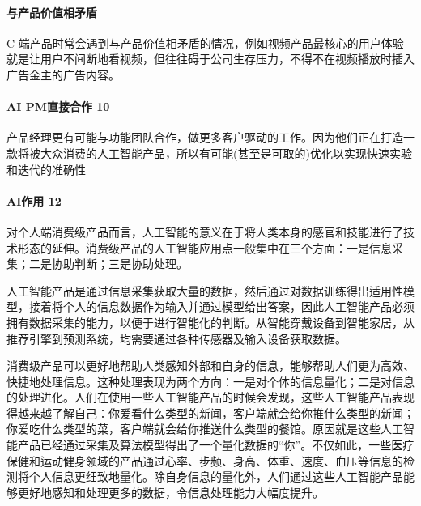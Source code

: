 \documentclass[letterpaper,11pt,english]{sphinxmanual}
\begin{document}
\paragraph{与产品价值相矛盾}
\label{\detokenize{chapter_introduction/2C:id11}}
C
端产品时常会遇到与产品价值相矛盾的情况，例如视频产品最核心的用户体验就是让用户不间断地看视频，但往往碍于公司生存压力，不得不在视频播放时插入广告金主的广告内容。


\paragraph{AI PM直接合作 10\sphinxfootnotemark[39]}
\label{\detokenize{chapter_introduction/2C:ai-pm-10}}%
\begin{footnotetext}[39]\sphinxAtStartFootnote
{}
%
\end{footnotetext}\ignorespaces 
产品经理更有可能与功能团队合作，做更多客户驱动的工作。因为他们正在打造一款将被大众消费的人工智能产品，所以有可能(甚至是可取的)优化以实现快速实验和迭代的准确性


\paragraph{AI作用 12\sphinxfootnotemark[40]}
\label{\detokenize{chapter_introduction/2C:ai-12}}%
\begin{footnotetext}[40]\sphinxAtStartFootnote
{}
%
\end{footnotetext}\ignorespaces 
对个人端消费级产品而言，人工智能的意义在于将人类本身的感官和技能进行了技术形态的延伸。消费级产品的人工智能应用点一般集中在三个方面：一是信息采集；二是协助判断；三是协助处理。

人工智能产品是通过信息采集获取大量的数据，然后通过对数据训练得出适用性模型，接着将个人的信息数据作为输入并通过模型给出答案，因此人工智能产品必须拥有数据采集的能力，以便于进行智能化的判断。从智能穿戴设备到智能家居，从推荐引擎到预测系统，均需要通过各种传感器及输入设备获取数据。

消费级产品可以更好地帮助人类感知外部和自身的信息，能够帮助人们更为高效、快捷地处理信息。这种处理表现为两个方向：一是对个体的信息量化；二是对信息的处理进化。人们在使用一些人工智能产品的时候会发现，这些人工智能产品表现得越来越了解自己：你爱看什么类型的新闻，客户端就会给你推什么类型的新闻；你爱吃什么类型的菜，客户端就会给你推送什么类型的餐馆。原因就是这些人工智能产品已经通过采集及算法模型得出了一个量化数据的“你”。不仅如此，一些医疗保健和运动健身领域的产品通过心率、步频、身高、体重、速度、血压等信息的检测将个人信息更细致地量化。除自身信息的量化外，人们通过这些人工智能产品能够更好地感知和处理更多的数据，令信息处理能力大幅度提升。
\end{document}
